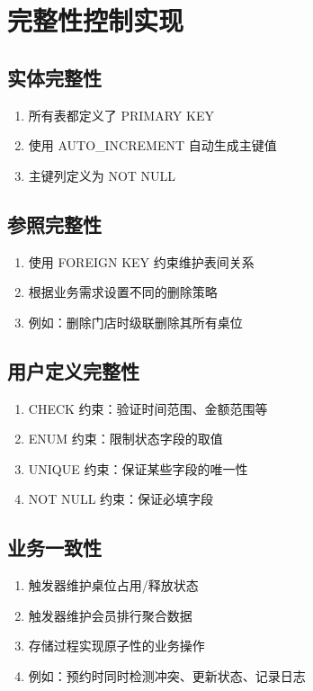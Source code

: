 \section{完整性控制实现}

\subsection{实体完整性}

\begin{enumerate}
  \item 所有表都定义了 PRIMARY KEY
  \item 使用 AUTO\_INCREMENT 自动生成主键值
  \item 主键列定义为 NOT NULL
\end{enumerate}

\subsection{参照完整性}

\begin{enumerate}
  \item 使用 FOREIGN KEY 约束维护表间关系
  \item 根据业务需求设置不同的删除策略
  \item 例如：删除门店时级联删除其所有桌位
\end{enumerate}

\subsection{用户定义完整性}

\begin{enumerate}
  \item CHECK 约束：验证时间范围、金额范围等
  \item ENUM 约束：限制状态字段的取值
  \item UNIQUE 约束：保证某些字段的唯一性
  \item NOT NULL 约束：保证必填字段
\end{enumerate}

\subsection{业务一致性}

\begin{enumerate}
  \item 触发器维护桌位占用/释放状态
  \item 触发器维护会员排行聚合数据
  \item 存储过程实现原子性的业务操作
  \item 例如：预约时同时检测冲突、更新状态、记录日志
\end{enumerate}

